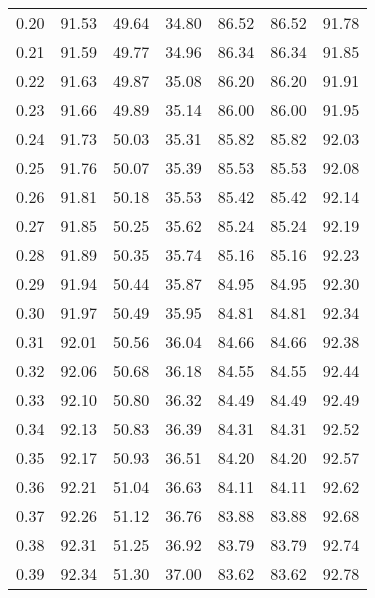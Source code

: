 \begin{tabular}{|c|c|c|c|c|c|c|}
      0.20 &     91.53 &     49.64 &      34.80 &   86.52 &      86.52 &         91.78 \\
      0.21 &     91.59 &     49.77 &      34.96 &   86.34 &      86.34 &         91.85 \\
      0.22 &     91.63 &     49.87 &      35.08 &   86.20 &      86.20 &         91.91 \\
      0.23 &     91.66 &     49.89 &      35.14 &   86.00 &      86.00 &         91.95 \\
      0.24 &     91.73 &     50.03 &      35.31 &   85.82 &      85.82 &         92.03 \\
      0.25 &     91.76 &     50.07 &      35.39 &   85.53 &      85.53 &         92.08 \\
      0.26 &     91.81 &     50.18 &      35.53 &   85.42 &      85.42 &         92.14 \\
      0.27 &     91.85 &     50.25 &      35.62 &   85.24 &      85.24 &         92.19 \\
      0.28 &     91.89 &     50.35 &      35.74 &   85.16 &      85.16 &         92.23 \\
      0.29 &     91.94 &     50.44 &      35.87 &   84.95 &      84.95 &         92.30 \\
      0.30 &     91.97 &     50.49 &      35.95 &   84.81 &      84.81 &         92.34 \\
      0.31 &     92.01 &     50.56 &      36.04 &   84.66 &      84.66 &         92.38 \\
      0.32 &     92.06 &     50.68 &      36.18 &   84.55 &      84.55 &         92.44 \\
      0.33 &     92.10 &     50.80 &      36.32 &   84.49 &      84.49 &         92.49 \\
      0.34 &     92.13 &     50.83 &      36.39 &   84.31 &      84.31 &         92.52 \\
      0.35 &     92.17 &     50.93 &      36.51 &   84.20 &      84.20 &         92.57 \\
      0.36 &     92.21 &     51.04 &      36.63 &   84.11 &      84.11 &         92.62 \\
      0.37 &     92.26 &     51.12 &      36.76 &   83.88 &      83.88 &         92.68 \\
      0.38 &     92.31 &     51.25 &      36.92 &   83.79 &      83.79 &         92.74 \\
      0.39 &     92.34 &     51.30 &      37.00 &   83.62 &      83.62 &         92.78 \\

\end{tabular}
